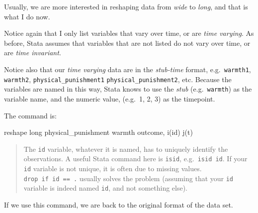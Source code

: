 \documentclass[
  letterpaper,
  DIV=11,
  numbers=noendperiod]{scrreprt}
\newenvironment{Shaded}{\begin{snugshade}}{\end{snugshade}}
\newcommand{\KeywordTok}[1]{\textcolor[rgb]{0.00,0.23,0.31}{#1}}
\newcommand{\NormalTok}[1]{\textcolor[rgb]{0.00,0.23,0.31}{#1}}
\begin{document}
Usually, we are more interested in reshaping data from \emph{wide} to
\emph{long}, and that is what I do now.

Notice again that I only list variables that vary over time, or are
\emph{time varying}. As before, Stata assumes that variables that are
not listed do not vary over time, or are \emph{time invariant}.

Notice also that our \emph{time varying} data are in the
\emph{stub-time} format, e.g.~\texttt{warmth1}, \texttt{warmth2},
\texttt{physical\_punishment1} \texttt{physical\_punishment2}, etc.
Because the variables are named in this way, Stata knows to use the
\emph{stub} (e.g.~\texttt{warmth}) as the variable name, and the numeric
value, (e.g.~1, 2, 3) as the timepoint.

The command is:

\begin{Shaded}
\begin{Highlighting}[]

\KeywordTok{reshape} \KeywordTok{long}\NormalTok{ physical\_punishment warmth outcome, i(id) j(t)}
\end{Highlighting}
\end{Shaded}

\begin{quote}
The \texttt{id} variable, whatever it is named, has to uniquely identify
the observations. A useful Stata command here is \texttt{isid},
e.g.~\texttt{isid\ id}. If your \texttt{id} variable is not unique, it
is often due to missing values. \texttt{drop\ if\ id\ ==\ .} usually
solves the problem (assuming that your \texttt{id} variable is indeed
named \texttt{id}, and not something else).
\end{quote}

If we use this command, we are back to the original format of the data
set.
\end{document}
